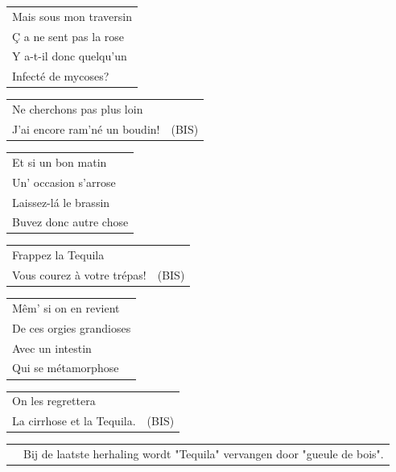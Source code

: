 \documentclass{article}
\begin{document}
\begin{flushleft}
\begin{tabularx}{0.8\textwidth} {
   >{\raggedright\arraybackslash}X}
Mais sous mon traversin \\
Ç a ne sent pas la rose \\
Y a-t-il donc quelqu’un \\
Infecté de mycoses? \\
\end{tabularx}
\begin{tabularx}{0.8\textwidth} {
   >{\raggedright\arraybackslash}X | c}
Ne cherchons pas plus loin & \\
J’ai encore ram’né un boudin! & (BIS)\\
\end{tabularx}
\end{flushleft}
\begin{flushleft}
\begin{tabularx}{0.8\textwidth} {
   >{\raggedright\arraybackslash}X}
Et si un bon matin \\
Un’ occasion s’arrose \\
Laissez-lá le brassin \\
Buvez donc autre chose \\
\end{tabularx}
\begin{tabularx}{0.8\textwidth} {
   >{\raggedright\arraybackslash}X | c}
Frappez la Tequila & \\
Vous courez à votre trépas!  & (BIS)\\
\end{tabularx}
\end{flushleft}
\begin{flushleft}
\begin{tabularx}{0.8\textwidth} {
   >{\raggedright\arraybackslash}X}
Mêm’ si on en revient\\
De ces orgies grandioses \\
Avec un intestin \\
Qui se métamorphose\\
\end{tabularx}
\begin{tabularx}{0.8\textwidth} {
   >{\raggedright\arraybackslash}X | c}
On les regrettera & \\
La cirrhose et la Tequila.  & (BIS)\\
\end{tabularx}
\end{flushleft}
\begin{flushleft}
\begin{tabularx}{0.8\textwidth} {
   c >{\raggedright\arraybackslash}X}
\hspace{5mm} & {\small }Bij de laatste herhaling wordt "Tequila" vervangen door "gueule de bois".
\end{tabularx}
\end{flushleft}
\end{document}
